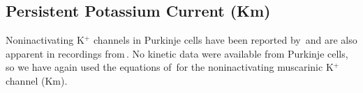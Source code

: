 \documentclass[12pt]{article}
\begin{document}
\subsection*{Persistent Potassium Current (Km)}

Noninactivating K$^+$ channels in Purkinje cells have been reported by\,\cite{Bossu:1989kl} and are also apparent in recordings from\,\cite{Hirano:1989uq}. No kinetic data were available from Purkinje cells, so we have again used the equations of\,\cite{Yamada-W:1989bs} for the noninactivating muscarinic K$^+$ channel (Km).



\end{document}
